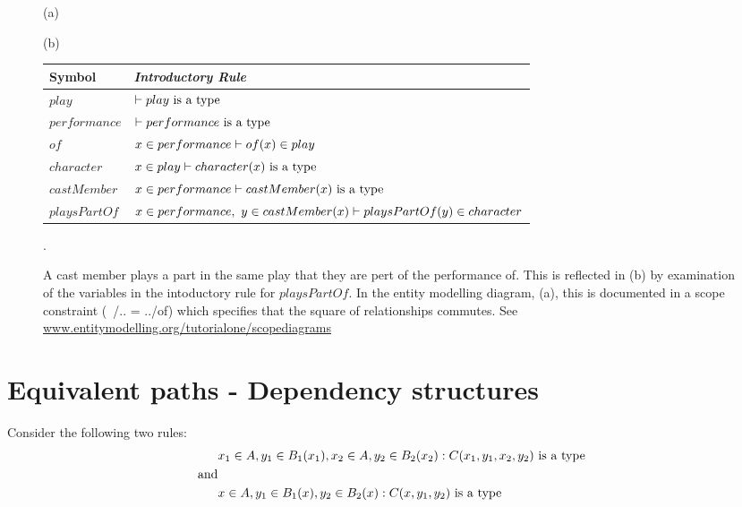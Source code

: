 \documentclass[12pt,a4paper]{article}
\begin{document}
\begin{center}
\begin{figure} [H]
(a) 

(b)
\begin{minipage}[c]{0.6 \textwidth}
\begin{tabular}{l l}
Symbol & \itshape{Introductory Rule} \\ 
\hline 
$play$ &$\vdash play\mbox{ is a type} $\\
$performance$ &$\vdash performance\mbox{ is a type} $\\
$of       $& $ x \in performance \vdash of(x) \in play$ \\
$character$&$x \in play \vdash character(x) \mbox{ is a type} $\\
$castMember$&$x \in performance \vdash castMember(x) \mbox{ is a type}$ \\
$playsPartOf$& $ x \in performance ,\ y \in castMember(x) \vdash playsPartOf(y) \in character $\\
\end{tabular}
\end{minipage}
\caption{A cast member plays a part in the same play that they are pert of the performance of. This is reflected in (b) by examination of the variables in the intoductory rule for $playsPartOf$. In the entity modelling diagram, (a), this is documented in a scope constraint (~/.. = ../of)  which specifies that the square of relationships commutes. See \href{http://www.entitymodelling.org/tutorialone/scopediagrams.html}
{www.entitymodelling.org/tutorialone/scopediagrams}}.
\label{citizen}
\end{figure}
\end{center}









\section{Equivalent paths - Dependency structures}

Consider the following two rules:
\begin{subequations}
\begin{align} 
           & x_1 \in A, y_1 \in B_1(x_1), x_2 \in A, y_2 \in B_2(x_2) : C(x_1,y_1,x_2,y_2) \mbox{ is a type}\label{multipleInstanceA}\\
\mbox{and}& \notag \\
           & x \in A, y_1 \in B_1(x), y_2 \in B_2(x) : C(x,y_1,y_2) \mbox{ is a type} \label{singleInstanceA}
\end{align}
\end{subequations}
\end{document}
